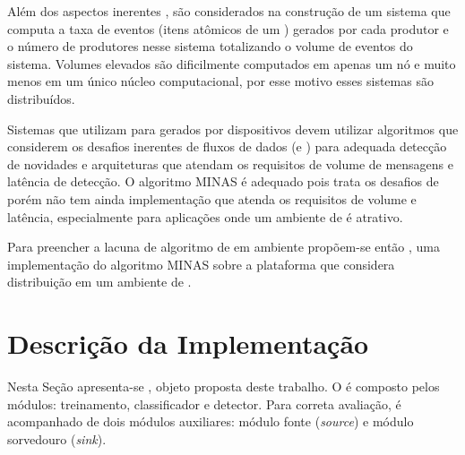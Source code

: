 Além dos aspectos inerentes \streamMining, são considerados na construção de um
sistema que computa \streams a taxa de eventos (itens atômicos de um \stream)
gerados por cada produtor e o número de produtores nesse sistema totalizando o
volume de eventos do sistema.
Volumes elevados são dificilmente computados em apenas um nó e muito menos em um
único núcleo computacional, por esse motivo esses sistemas são distribuídos.

Sistemas que utilizam \nd para \streams gerados por dispositivos \iot devem
utilizar algoritmos que considerem os desafios inerentes de fluxos de dados
(\evolution e \drift) para adequada detecção de novidades e arquiteturas
que atendam os requisitos de volume de mensagens e latência de detecção.
O algoritmo MINAS é adequado pois trata os desafios de \streamMining porém não
tem ainda implementação que atenda os requisitos de volume e latência,
especialmente para aplicações \iot onde um ambiente de \fog é atrativo.

Para preencher a lacuna de algoritmo de \nd em ambiente \fog propõem-se então
\mfog, uma implementação do algoritmo MINAS sobre a plataforma \flink que
considera distribuição em um ambiente de \fog.


\section{Descrição da Implementação}\label{sec:descricao}

\newcommand{\source}{\emph{source}\xspace}
\newcommand{\sink}{\emph{sink}\xspace}

\newcommand{\offline}{treinamento\xspace}
\newcommand{\classify}{classificador\xspace}
\newcommand{\detector}{detector\xspace}

\newcommand{\idsiot}{IDSA-IOT\xspace}

Nesta Seção apresenta-se \mfog, objeto proposta deste trabalho.
O \mfog é composto pelos módulos: \offline, \classify e \detector.
Para correta avaliação, \mfog é acompanhado de dois módulos auxiliares:
módulo fonte (\source) e módulo sorvedouro (\sink).



